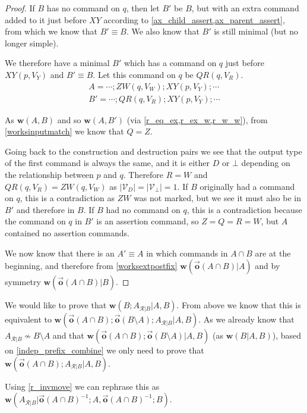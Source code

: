 \documentclass[12pt]{article}
\newcommand{\setvx}[1]{\mathcal{V}_{#1}}
\newcommand{\setd}{\setvx{D}}
\newcommand{\setb}{\setvx{\empt}}
\newcommand{\empt}{\bot}
\newcommand{\fscommand}[2]{{#1#2}}
\newcommand{\cxy}{\fscommand{X}{Y}}
\newcommand{\czw}{\fscommand{Z}{W}}
\newcommand{\cqr}{\fscommand{Q}{R}}
\newcommand{\indep}{\not\sim}
\newcommand{\works}[1]{{\mathbf{w}}({#1})}
\newcommand{\worksc}[2]{{\mathbf{w}}({#1}|{#2})}
\newcommand{\ordered}[1]{\vec{\mathbf{o}}({#1})}
\newcommand{\recchar}[3]{{#1}^{#3}_{\mathcal{R}|{#2}}}
\newcommand{\reca}{\recchar{A}{B}{}} %
\theoremstyle{definition}
\begin{document}
\begin{proof}
If $B$ has no command on $q$, then let $B'$ be $B$, but with an extra command added to it just before $\cxy$
according to \cref{ax_child_assert,ax_parent_assert}, from which we know
that $B'\equiv B$.
We also know that $B'$ is still minimal (but no longer simple).

We therefore have a minimal $B'$ which has a command on $q$ just before $\cxy(p, V_Y)$ and $B'\equiv B$.
Let this command on $q$ be $\cqr(q, V_R)$.
\begin{gather*}
A = \cdots; \czw(q, V_W); \cxy(p, V_Y); \cdots \\
B' = \cdots; \cqr(q, V_R); \cxy(p, V_Y); \cdots
\end{gather*}

As $\works{A,B}$ and so $\works{A,B'}$ (via \cref{r_eq_ex,r_ex_w,r_w_w}), 
from \cref{worksinputmatch}
we know that $Q=Z$. 

Going back to the construction and destruction pairs we see that the output type of the first command
is always the same, and it is either $D$ or $\empt$ depending on the relationship between $p$ and $q$.
Therefore $R=W$ and $\cqr(q, V_R)=\czw(q, V_W)$
as $|\setd|=|\setb|=1$. 
If $B$ originally had a command on $q$,
this is a contradiction as $\czw$ was not marked, but we see it must also be in $B'$ and therefore in $B$.
If $B$ had no command on $q$,
this is a contradiction because the command on $q$ in $B'$ is an assertion command, so $Z=Q=R=W$, 
but $A$ contained no assertion commands.

\medskip

We now know that there is an $A'\equiv A$ in which commands in $A\cap B$
are at the beginning, and therefore 
from \cref{worksextpostfix}
$\worksc{\ordered{A\cap B}}{A}$ and by symmetry $\worksc{\ordered{A\cap B}}{B}$.
\end{proof}

\medskip

We would like to prove that $\worksc{B;\reca}{A,B}$.
From above we know that this is equivalent to
$\worksc{\ordered{A\cap B};\ordered{B\setminus A};\reca}{A,B}$.
As we already know that $\reca\indep B\setminus A$
and that $\worksc{\ordered{A\cap B};\ordered{B\setminus A}}{A,B}$
(as $\worksc{B}{A,B}$),
based on \cref{indep_prefix_combine}
we only need to prove that
$\worksc{\ordered{A\cap B};\reca}{A,B}$.

\newcommand{\acbi}{\ordered{A\cap B}^{-1}}
\newcommand{\amb}{A\setminus B}
\newcommand{\bma}{B\setminus A}
Using \cref{r_invmove} we can rephrase this as
$\worksc{\reca}{\acbi;A,\acbi;B}$.
\end{document}
